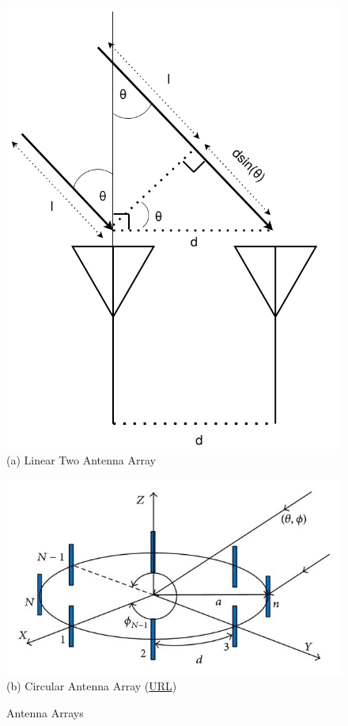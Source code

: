 \begin{figure} [H]
	\centering
    \begin{minipage}{.5\textwidth}
      \centering
      \includegraphics[width=0.8\linewidth]{../Photos/aoa-2antennas.png}\\
      {(a) Linear Two Antenna Array}
    \end{minipage}%
    \begin{minipage}{.5\textwidth}
      \centering
      \includegraphics[width=\linewidth]{Images/Theoretical-Background/The-antenna-array-geometry-a-linear-and-b-circular_W640.jpeg}\\
      {(b) Circular Antenna Array (\href{https://www.researchgate.net/publication/298331796_Adaptive_Array_Beamforming_Using_a_Chaotic_Beamforming_Algorithm/figures}{URL})}
	\end{minipage}
    \hfill \break
    \decoRule
    \caption[Antenna Arrays]{Antenna Arrays}
    \label{fig:Antenna-Arrays}
\end{figure}

